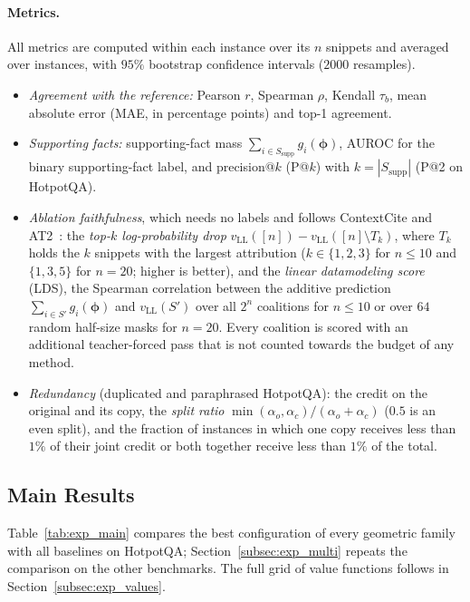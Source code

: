 \paragraph{Metrics.}
All metrics are computed within each instance over its $n$ snippets and averaged over instances, with $95\%$ bootstrap confidence intervals ($2000$ resamples).
\begin{itemize}
    \item \emph{Agreement with the reference:} Pearson $r$, Spearman $\rho$, Kendall $\tau_b$, mean absolute error (MAE, in percentage points) and top-1 agreement.
    \item \emph{Supporting facts:} supporting-fact mass $\sum_{i \in S_{\text{supp}}} g_i(\boldsymbol{\phi})$, AUROC for the binary supporting-fact label, and precision@$k$ (P@$k$) with $k = |S_{\text{supp}}|$ (P@2 on HotpotQA).
    \item \emph{Ablation faithfulness}, which needs no labels and follows ContextCite and AT2~\cite{cohen2024contextcite,cohenwang2025learning}: the \emph{top-$k$ log-probability drop} $v_{\text{LL}}([n]) - v_{\text{LL}}([n] \setminus T_k)$, where $T_k$ holds the $k$ snippets with the largest attribution ($k \in \{1, 2, 3\}$ for $n \le 10$ and $\{1, 3, 5\}$ for $n = 20$; higher is better), and the \emph{linear datamodeling score} (LDS), the Spearman correlation between the additive prediction $\sum_{i \in S'} g_i(\boldsymbol{\phi})$ and $v_{\text{LL}}(S')$ over all $2^n$ coalitions for $n \le 10$ or over $64$ random half-size masks for $n = 20$. Every coalition is scored with an additional teacher-forced pass that is not counted towards the budget of any method.
    \item \emph{Redundancy} (duplicated and paraphrased HotpotQA): the credit on the original and its copy, the \emph{split ratio} $\min(\alpha_o, \alpha_c) / (\alpha_o + \alpha_c)$ ($0.5$ is an even split), and the fraction of instances in which one copy receives less than $1\%$ of their joint credit or both together receive less than $1\%$ of the total.
\end{itemize}

\subsection{Main Results}
\label{subsec:exp_main}

Table~\ref{tab:exp_main} compares the best configuration of every geometric family with all baselines on HotpotQA; Section~\ref{subsec:exp_multi} repeats the comparison on the other benchmarks. The full grid of value functions follows in Section~\ref{subsec:exp_values}.

